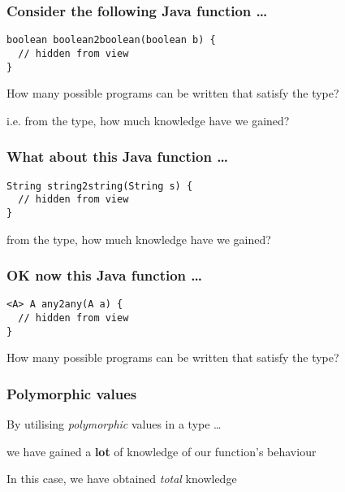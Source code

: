 \begin{frame}[fragile]
\frametitle{Consider the following Java function \ldots}
\begin{block}{}
\begin{lstlisting}[style=java]
boolean boolean2boolean(boolean b) {
  // hidden from view 
}
\end{lstlisting}
\end{block}
\begin{center}
How many possible programs can be written that satisfy the type?

i.e. from the type, how much knowledge have we gained?
\end{center}
\end{frame}

\begin{frame}[fragile]
\frametitle{What about this Java function \ldots}
\begin{block}{}
\begin{lstlisting}[style=java]
String string2string(String s) {
  // hidden from view 
}
\end{lstlisting}
\end{block}
\begin{center}
from the type, how much knowledge have we gained?
\end{center}
\end{frame}

\begin{frame}[fragile]
\frametitle{OK now this Java function \ldots}
\begin{block}{}
\begin{lstlisting}[style=java]
<A> A any2any(A a) {
  // hidden from view 
}
\end{lstlisting}
\end{block}
\begin{center}
How many possible programs can be written that satisfy the type?
\end{center}
\end{frame}

\begin{frame}[fragile]
\frametitle{Polymorphic values}
\begin{block}{By utilising \emph{polymorphic} values in a type \ldots}
\begin{center}
we have gained a \textbf{lot} of knowledge of our function's behaviour

In this case, we have obtained \emph{total} knowledge
\end{center}
\end{block}
\end{frame}

